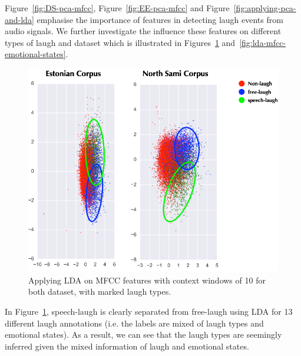 \documentclass[10pt,journal,compsoc]{IEEEtran}
\begin{document}
Figure~\ref{fig:DS-pca-mfcc}, Figure~\ref{fig:EE-pca-mfcc} and Figure~\ref{fig:applying-pca-and-lda} emphasise the importance of features in detecting laugh events from audio signals.
We further investigate the influence these features on different types of laugh and dataset which is illustrated in
Figures~\ref{fig:lda-mfcc-laugh-types} and~\ref{fig:lda-mfcc-emotional-states}.

\begin{figure}[!t]
\centering
\includegraphics[width=1\linewidth]{images/LDA-MFCC-laugh-types.png}
\caption{Applying LDA on MFCC features with context windows of 10 for both dataset, with marked laugh types.}
\label{fig:lda-mfcc-laugh-types}
\end{figure}

In Figure~\ref{fig:lda-mfcc-laugh-types}, speech-laugh is clearly separated from free-laugh using LDA for 13 different laugh annotations (i.e. the labels are mixed of laugh types and emotional states). As a result, we can see that the laugh types are seemingly inferred given the mixed information of laugh and emotional states.
\end{document}

